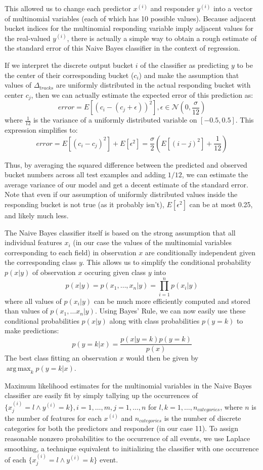 \documentclass[conference]{IEEEtran}
\DeclareMathOperator*{\argmax}{arg\,max}
\begin{document}
This allowed us to change each predictor $x^{(i)}$ and responder $y^{(i)}$ into a vector of multinomial variables (each of which has 10 possible values). Because adjacent bucket indices for the multinomial responding variable imply adjacent values for the real-valued $y^{(i)}$, there is actually a simple way to obtain a rough estimate of the standard error of this Naive Bayes classifier in the context of regression.

If we interpret the discrete output bucket $i$ of the classifier as predicting $y$ to be the center of their corresponding bucket ($c_i$) and make the assumption that values of $\Delta_{tracks}$ are uniformly distributed in the actual responding bucket with center $c_j$, then we can actually estimate the expected error of this prediction as:
$$error = E[(c_i - (c_j + \epsilon))^2], \epsilon \in \mathcal{N}(0, \frac{\sigma}{12})$$
where $\frac{1}{12}$ is the variance of a uniformly distributed variable on $[-0.5, 0.5]$. This expression simplifies to:
$$error = E[(c_i - c_j)^2] + E[\epsilon^2] = \frac{\sigma}{2} (E[(i-j)^2] + \frac{1}{12})$$

Thus, by averaging the squared difference between the predicted and observed bucket numbers across all test examples and adding $1/12$, we can estimate the average variance of our model and get a decent estimate of the standard error. Note that even if our assumption of uniformly distributed values inside the responding bucket is not true (as it probably isn't), $E[\epsilon^2]$ can be at most 0.25, and likely much less.

The Naive Bayes classifier itself is based on the strong assumption that all individual features $x_i$ (in our case the values of the multinomial variables corresponding to each field) in observation $x$ are conditionally independent given the corresponding class $y$. This allows us to simplify the conditional probability $p(x|y)$ of observation $x$ occuring given class $y$ into
$$p(x|y) = p(x_1,\dots,x_n | y) = \prod_{i=1}^n p(x_i|y)$$
where all values of $p(x_i|y)$ can be much more efficiently computed and stored than values of $p(x_1,\dots x_n|y)$. Using Bayes' Rule, we can now easily use these conditional probabilities $p(x|y)$ along with class probabilities $p(y=k)$ to make predictions:
$$p(y=k|x) = \frac{p(x|y=k)p(y=k)}{p(x)}$$
The best class fitting an observation $x$ would then be given by $\argmax_k p(y=k|x)$.

Maximum likelihood estimates for the multinomial variables in the Naive Bayes classifier are easily fit by simply tallying up the occurrences of $\{x^{(i)}_j = l \wedge y^{(i)} = k\}, i=1,\dots,m, j=1,\dots,n$ for $l,k=1,\dots,n_{categories}$, where $n$ is the number of features for each $x^{(i)}$ and $n_{categories}$ is the number of discrete categories for both the predictors and responder (in our case 11). To assign reasonable nonzero probabilities to the occurrence of all events, we use Laplace smoothing, a technique equivalent to initializing the classifier with one occurrence of each $\{x^{(i)}_j = l \wedge y^{(i)} = k\}$ event.
\end{document}
